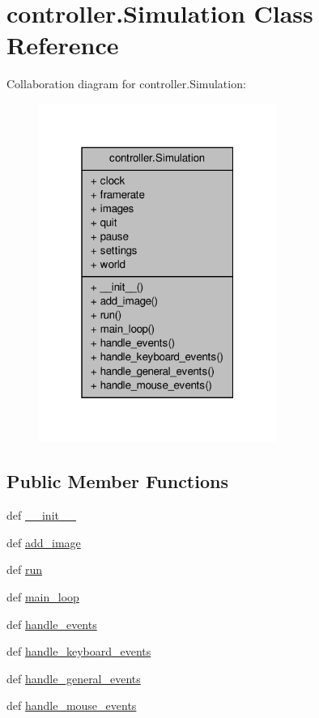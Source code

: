 \hypertarget{classcontroller_1_1Simulation}{\section{controller.\+Simulation Class Reference}
\label{classcontroller_1_1Simulation}
}


Collaboration diagram for controller.\+Simulation\+:
\nopagebreak
\begin{figure}[H]
\begin{center}
\leavevmode
\includegraphics[width=220pt]{classcontroller_1_1Simulation__coll__graph}
\end{center}
\end{figure}
\subsection*{Public Member Functions}
\begin{DoxyCompactItemize}
\item 
def \hyperlink{classcontroller_1_1Simulation_a0d3a98e6f630a62f18aa5c0c35846381}{\+\_\+\+\_\+init\+\_\+\+\_\+}
\item 
def \hyperlink{classcontroller_1_1Simulation_a91674f018c921725aa36ec25396a7304}{add\+\_\+image}
\item 
def \hyperlink{classcontroller_1_1Simulation_a4cbf2928d3f930f4b8cad9c0e64c2524}{run}
\item 
def \hyperlink{classcontroller_1_1Simulation_ad86d932f45e2b80ec5336da7c6e6e085}{main\+\_\+loop}
\item 
def \hyperlink{classcontroller_1_1Simulation_ad3eb13a30931a88958e3c0c7b5b545a5}{handle\+\_\+events}
\item 
def \hyperlink{classcontroller_1_1Simulation_a247d22a52798856055de287bd13a6cda}{handle\+\_\+keyboard\+\_\+events}
\item 
def \hyperlink{classcontroller_1_1Simulation_ad459f264509c14b43f23894dc35d6656}{handle\+\_\+general\+\_\+events}
\item 
def \hyperlink{classcontroller_1_1Simulation_aa43d3916e7ff0513f950439d7ae8b5b7}{handle\+\_\+mouse\+\_\+events}
\end{DoxyCompactItemize}

